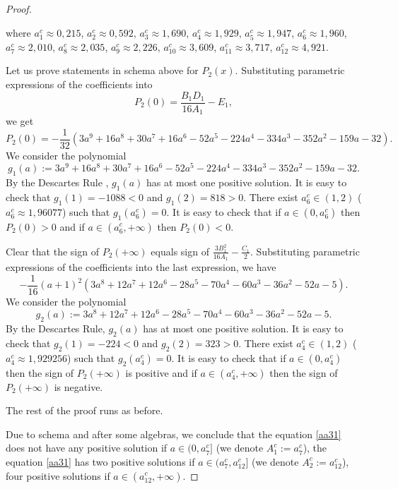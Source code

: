 \documentclass[sn-mathphys]{sn-jnl}%
\theoremstyle{thmstyleone}%
\theoremstyle{thmstyletwo}%
\theoremstyle{thmstylethree}%
\begin{document}
\begin{proof}
\begin{center}
{ where $a_1^c\approx0,215$, $a_2^c\approx0,592$, $a_3^c\approx1,690$, $a_4^c\approx1,929$, $a_5^c\approx1,947$, $a_6^c\approx1,960$, $a_7^c\approx2,010$, $a_8^c\approx2,035$, $a_9^c\approx2,226$, $a_{10}^c\approx3,609$, $a_{11}^c\approx3,717$, $a_{12}^c\approx4,921$.}
\end{center}

Let us prove statements in schema above for $P_2(x)$. Substituting parametric expressions of the coefficients into  $$P_2(0)=\frac{B_1D_1}{16A_1}-E_1,$$ we get
$$P_2(0)=-\frac{1}{32}(3a^9+16a^8+30a^7+16a^6-52a^5-224a^4-334a^3-352a^2-159a-32).$$
We consider the polynomial $$g_1(a):=3a^9+16a^8+30a^7+16a^6-52a^5-224a^4-334a^3-352a^2-159a-32.$$ By the Descartes Rule \cite{Prasolov}, $g_1(a)$ has at most one positive solution. It is easy to check that $g_1(1)=-1088<0$ and $g_1(2)=818>0$. There exist $a_6^c\in(1,2)$ ($a_6^c\approx1,96077$) such that $g_1(a_6^c)=0$. It is easy to check that if $a\in (0, a_6^c)$ then $P_2(0)>0$ and if $a\in (a_6^c, +\infty)$ then $P_2(0)<0$.

Clear that the sign of $P_2(+\infty)$ equals sign of $\frac{3B_1^2}{16A_1}-\frac{C_1}{2}$. Substituting parametric expressions of the coefficients into the last expression, we have $$-\frac{1}{16}(a+1)^2(3a^8+12a^7+12a^6-28a^5-70a^4-60a^3-36a^2-52a-5).$$
We consider the polynomial $$g_2(a):=3a^8+12a^7+12a^6-28a^5-70a^4-60a^3-36a^2-52a-5.$$ By the Descartes Rule, $g_2(a)$ has at most one positive solution. It is easy to check that $g_2(1)=-224<0$ and $g_2(2)=323>0$. There exist $a_4^c\in(1,2)$ ($a_4^c\approx1,929256$) such that $g_2(a_4^c)=0$. It is easy to check that if $a\in (0, a_4^c)$ then the sign of $P_2(+\infty)$ is positive and if $a\in (a_4^c, +\infty)$ then the sign of $P_2(+\infty)$ is negative.

The rest of the proof runs as before.

Due to schema and after some algebras, we conclude that the equation \eqref{aa31} does not have any positive solution if $a\in (0, a_7^c]$ (we denote $A_1^c:=a_7^c$), the equation \eqref{aa31} has two positive solutions if $a\in (a_7^c, a_{12}^c]$ (we denote $A_2^c:=a_{12}^c$), four positive solutions if $a\in (a_{12}^c,+\infty)$.
\end{proof}
\end{document}
